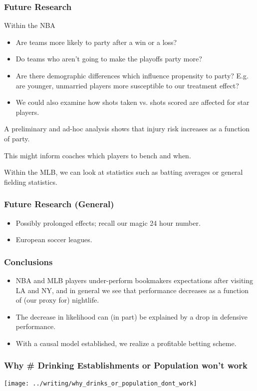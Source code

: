 \documentclass{beamer}
\begin{document}
\begin{frame}   \frametitle{Future Research}
  Within the NBA
  \begin{itemize}     \item Are teams more likely to party after a win or a loss?
    \item Do teams who aren't going to make the playoffs party more?
    \item Are there demographic differences which influence propensity to party? E.g. are younger, unmarried players more susceptible to our treatment effect?
    \item We could also examine how shots taken vs. shots scored are affected for star players.
  \end{itemize}
  A preliminary and ad-hoc analysis shows that injury risk increases as a function of party.

  This might inform coaches which players to bench and when.

  Within the MLB, we can look at statistics such as batting averages or general fielding statistics. \end{frame}

\begin{frame}   \frametitle{Future Research (General)}
  \begin{itemize}     \item Possibly prolonged effects; recall our magic 24 hour number.
    \item European soccer leagues.   \end{itemize} \end{frame}

\begin{frame}   \frametitle{Conclusions}
  \begin{itemize}     \item NBA and MLB players under-perform bookmakers expectations after visiting LA and NY, and in general we see that performance decreases as a function of (our proxy for) nightlife.
    \item The decrease in likelihood can (in part) be explained by a drop in defensive performance.
    \item With a causal model established, we realize a profitable betting scheme.   \end{itemize} \end{frame}

\begin{frame}   \frametitle{Why \# Drinking Establishments or Population won't work}
  \texttt{[image: ../writing/why\_drinks\_or\_population\_dont\_work]} \end{frame}
\end{document}
